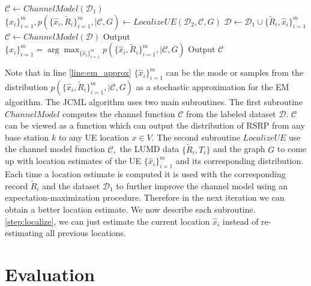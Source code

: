 \documentclass[conference, 10pt]{IEEEtran}
\begin{document}
\begin{algorithm}
\caption{$JCML(\mathcal{D}_1, \mathcal{D}_2, G, N_{em})$}
\label{alg:joint_ch_model_loc}
\begin{algorithmic}[1]
\State $\mathcal{C} \gets ChannelModel(\mathcal{D}_1)$
	\State $\{\hat{x}_i\}_{i=1}^m, p(\{\hat{x}_i,\tilde{R}_i\}_{i=1}^m,|\mathcal{C},G) \gets LocalizeUE(\mathcal{D}_2,\mathcal{C},G)$ \label{step:localize}
	\State $\mathcal{D} \gets \mathcal{D}_1 \cup \{\tilde{R}_i,\hat{x}_i\}_{i=1}^m$ \label{line:em_approx}
	\State $\mathcal{C} \gets ChannelModel(\mathcal{D})$
\EndFor
\State Output $\{\hat{x}_i\}_{i=1}^m = \arg \max_{\{\hat{x}_i\}_{i=1}^m} p(\{\hat{x}_i,\tilde{R}_i\}_{i=1}^m,|\mathcal{C},G)$
\State Output $\mathcal{C}$
\end{algorithmic}
\end{algorithm}  

Note that in line \ref{line:em_approx} $\{\hat{x}_i\}_{i=1}^m$ can be the mode
or samples from the distribution
$p(\{\hat{x}_i,\tilde{R}_i\}_{i=1}^m,|\mathcal{C},G)$ as a stochastic
approximation for the EM algorithm. The JCML algorithm uses two main
subroutines. The first subroutine $ChannelModel$ computes the channel function
$\mathcal{C}$ from the labeled dataset $\mathcal{D}.$ $\mathcal{C}$ can be
viewed as a function which can output the distribution of RSRP from any base
station $k$ to any UE location $x \in V.$ The second subroutine $LocalizeUE$
use the channel model function $\mathcal{C},$ the LUMD data
$\{\tilde{R}_i,T_i\}$ and the graph $G$ to come up with location estimates of
the UE $\{\hat{x}_i\}_{i=1}^m$ and its corresponding distribution. Each time a
location estimate is computed it is used with the corresponding record
$\tilde{R}_i$ and the dataset $\mathcal{D}_1$ to further improve the channel
model using an expectation-maximization procedure. Therefore in the next
iteration we can obtain a better location estimate. We now describe each
subroutine. %
\ref{step:localize}, we can just estimate the current location $\hat{x}_i$
instead of re-estimating all previous locations.

\fi

\section{Evaluation}
\label{sec:eval}
\end{document}
